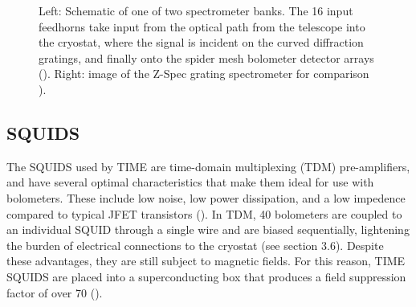 \documentclass[manuscript]{aastex}
\begin{document}
\begin{figure}[H]%
    \centering
    \qquad
    \singlespace
    \caption[TIME Spectrometer Banks and Detector Modules -(\cite{Hunacek2016})]{Left: Schematic of one of two spectrometer banks. The 16 input feedhorns take input from the optical path from the telescope into the cryostat, where the signal is incident on the curved diffraction gratings, and finally onto the spider mesh bolometer detector arrays (\cite{Hunacek2016}). Right: image of the Z-Spec grating spectrometer for comparison \cite{Crites2014}).}%
    \label{fig:jon2}%
    \vspace{-0.8cm}
\end{figure}
\subsection{\textbf{SQUIDS}}

The SQUIDS used by TIME are time-domain multiplexing (TDM) pre-amplifiers, and have several optimal characteristics that make them ideal for use with bolometers. These include low noise, low power dissipation, and a low impedence compared to typical JFET transistors (\cite{Dobbs2009}). In TDM, 40 bolometers are coupled to an individual SQUID through a single wire and are biased sequentially, lightening the burden of electrical connections to the cryostat (see section 3.6). Despite these advantages, they are still subject to magnetic fields. For this reason, TIME SQUIDS are placed into a superconducting box that produces a field suppression factor of over 70 (\cite{Hunacek2016b}).
\end{document}
